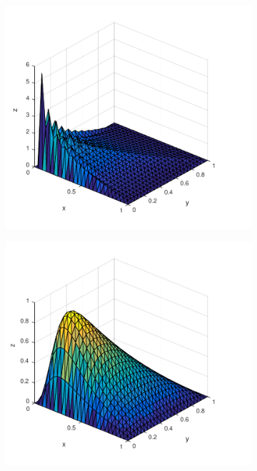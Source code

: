\begin{figure}[h!]
  \centering
  \begin{subfigure}[b]{0.48\textwidth}
	\includegraphics[width=\textwidth]{Figures/FEM_difftrans_aNeg.pdf}
  \end{subfigure}%
  \quad
  \begin{subfigure}[b]{0.48\textwidth}
	\includegraphics[width=\textwidth]{Figures/LSFEM_difftrans_aNeg.pdf}

\end{subfigure}
\end{figure}
